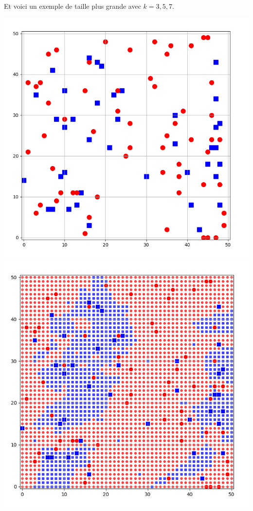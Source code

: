 \documentclass[11pt,class=report,crop=false]{standalone}
\begin{document}
\begin{activite}
\begin{enumerate}
\begin{enumerate}
Et voici un exemple de taille plus grande avec $k=3,5,7$.
\begin{center}
	\includegraphics[scale=\myscale,scale=0.133]{ecran-voisins-9a}
	\includegraphics[scale=\myscale,scale=0.137]{ecran-voisins-9b}

\end{center}
\end{enumerate}
\end{enumerate}
\end{activite}
\end{document}
